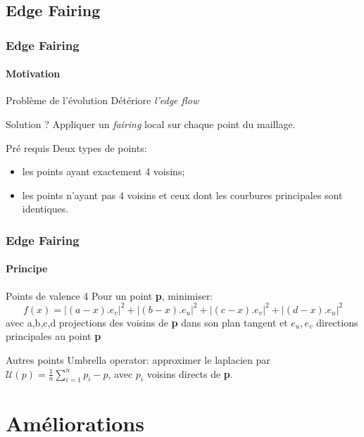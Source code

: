 \documentclass[9pt]{beamer}
\begin{document}
\subsection{Edge Fairing}

\begin{frame}
	\frametitle{Edge Fairing}
	\framesubtitle{Motivation}
	
	\begin{block}{Problème de l'évolution}
		Détériore \textit{l'edge flow}
	\end{block}
	
	\begin{block}{Solution ?}
		Appliquer un \textit{fairing} local sur chaque point du maillage.
	\end{block}
	
	\begin{block}{Pré requis}
		Deux types de points:
		\begin{itemize}
			\item les points ayant exactement 4 voisins;
			\item les points n'ayant pas 4 voisins et ceux dont les courbures principales sont identiques.
		\end{itemize}
	\end{block}
\end{frame}

\begin{frame}
	\frametitle{Edge Fairing}
	\framesubtitle{Principe}
	
	\begin{block}{Points de valence 4}
		Pour un point \textbf{p}, minimiser:
		\begin{equation*}
			f(x) = |(a-x).e_v|^2 + |(b-x).e_u|^2 + |(c-x).e_v|^2 + |(d-x).e_u|^2
		\end{equation*}
		avec a,b,c,d projections des voisins de \textbf{p} dans son plan tangent et $e_u, e_v$ directions principales au point 				\textbf{p}
	\end{block}
	
	\begin{block}{Autres points}
		Umbrella operator: approximer le laplacien par $\mathcal{U}(p) = \displaystyle \frac{1}{n} \sum \limits_{i=1}^{n} p_i - p$, avec $p_i$ voisins directs de \textbf{p}.
	\end{block}
\end{frame}

\section{Améliorations}
\end{document}
